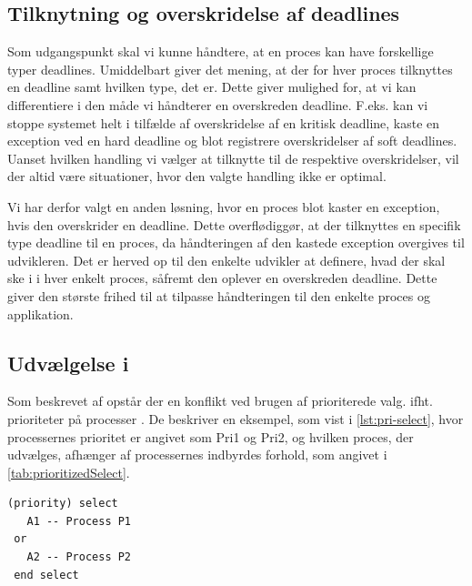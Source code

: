 \subsection{Tilknytning og overskridelse af deadlines}
Som udgangspunkt skal vi kunne håndtere, at en proces kan have forskellige typer deadlines. Umiddelbart giver det mening, at der for hver proces tilknyttes en deadline samt hvilken type, det er. Dette giver mulighed for, at vi kan differentiere i den måde vi håndterer en overskreden deadline. F.eks. kan vi stoppe systemet helt i tilfælde af overskridelse af en kritisk deadline, kaste en exception ved en hard deadline og blot registrere overskridelser af soft deadlines. Uanset hvilken handling vi vælger at tilknytte til de respektive overskridelser, vil der altid være situationer, hvor den valgte handling ikke er optimal. 

Vi har derfor valgt en anden løsning, hvor en proces blot kaster en exception, hvis den overskrider en deadline. Dette overflødiggør, at der tilknyttes en specifik type deadline til en proces, da håndteringen af den kastede exception overgives til udvikleren. Det er herved op til den enkelte udvikler at definere, hvad der skal ske i i hver enkelt proces, såfremt den oplever en overskreden deadline. Dette giver den største frihed til at tilpasse håndteringen til den enkelte proces og applikation. 

\subsection{Udvælgelse i }
Som  beskrevet af \citeauthor{Burns1990} opstår der en konflikt ved brugen af  prioriterede valg. ifht. prioriteter på processer \cite{Burns1990}. De beskriver en eksempel, som vist i \cref{lst:pri-select}, hvor processernes prioritet er angivet som Pri1 og Pri2, og hvilken proces, der udvælges, afhænger af processernes indbyrdes forhold, som angivet i \cref{tab:prioritizedSelect}.


\begin{lstlisting}[firstnumber=1 ,float=hbtp, label=lst:pri-select, caption={(priority) select. Eksemplet er kopieret fra \cite[160]{Burns1990}}]
(priority) select
   A1 -- Process P1
 or
   A2 -- Process P2
 end select
\end{lstlisting}

